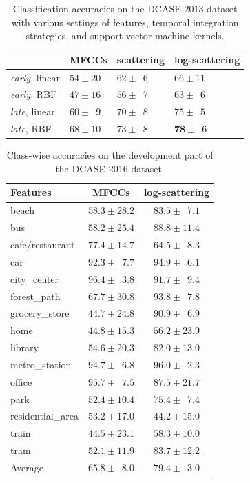 \documentclass[journal]{IEEEtran}
\begin{document}
\begin{table}
\begin{center}
\caption{
\label{table:dcase2013}
Classification accuracies on the DCASE 2013 dataset with various settings of features, temporal integration strategies, and support vector machine kernels.
}
\begin{tabular}{llll}
             & MFCCs         & scattering & log-scattering  \\
             \hline
\emph{early}, linear  & $54\pm20$   & $62\pm\phantom{0}6$  & $66\pm11$     \\
\emph{early}, RBF     & $47\pm16$  & $56\pm\phantom{0}7$  & $63\pm\phantom{0}6$   \\
\emph{late}, linear  & $60\pm\phantom{0}9$ & $70\pm\phantom{0}8$  & $75\pm\phantom{0}5$   \\
\emph{late}, RBF     & $68\pm10$ & $73\pm\phantom{0}8$  & $\mathbf{78}\pm\phantom{0}6$   \\
\end{tabular}
\end{center}
\end{table}

\begin{table}
\begin{center}
\caption{Class-wise accuracies on the development part of the DCASE 2016 dataset.\label{table:dcase2016}}
\begin{tabular}{lcc}
Features & MFCCs & log-scattering \\
\midrule
beach & $58.3 \pm 28.2$ & $83.5 \pm \phantom{0}7.1$ \\
bus & $58.2 \pm 25.4$ & $88.8 \pm 11.4$ \\
cafe/restaurant & $77.4 \pm 14.7$ & $64.5 \pm \phantom{0}8.3$ \\
car & $92.3 \pm \phantom{0}7.7$ & $94.9 \pm \phantom{0}6.1$ \\
city\_center & $96.4 \pm \phantom{0}3.8$ & $91.7 \pm \phantom{0}9.4$ \\
forest\_path & $67.7 \pm 30.8$ & $93.8 \pm \phantom{0}7.8$ \\
grocery\_store & $44.7 \pm 24.8$ & $90.9 \pm \phantom{0}6.9$ \\
home & $44.8 \pm 15.3$ & $56.2 \pm 23.9$ \\
library & $54.6 \pm 20.3$ & $82.0 \pm 13.0$ \\
metro\_station & $94.7 \pm \phantom{0}6.8$ & $96.0 \pm \phantom{0}2.3$ \\
office & $95.7 \pm \phantom{0}7.5$ & $87.5 \pm 21.7$ \\
park & $52.4 \pm 10.4$ & $75.4 \pm \phantom{0}7.4$ \\
residential\_area & $53.2 \pm 17.0$ & $44.2 \pm 15.0$ \\
train & $44.5 \pm 23.1$ & $58.3 \pm 10.0$ \\
tram & $52.1 \pm 11.9$ & $83.7 \pm 12.2$ \\
\bottomrule
Average & $65.8 \pm \phantom{0}8.0$ & $79.4 \pm \phantom{0}3.0$ \\
\end{tabular}
\end{center}

\end{table}
\end{document}
